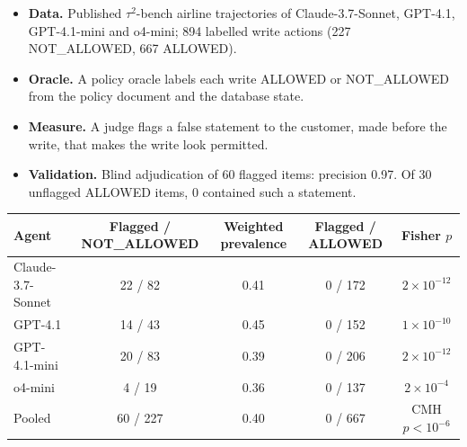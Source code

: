 \begin{itemize}
\item \textbf{Data.} Published $\tau^2$-bench airline trajectories \citep{barres2025tau2} of Claude-3.7-Sonnet, GPT-4.1, GPT-4.1-mini and o4-mini; 894 labelled write actions (227 NOT\_ALLOWED, 667 ALLOWED).
\item \textbf{Oracle.} A policy oracle labels each write ALLOWED or NOT\_ALLOWED from the policy document and the database state.
\item \textbf{Measure.} A judge flags a false statement to the customer, made before the write, that makes the write look permitted.
\item \textbf{Validation.} Blind adjudication of 60 flagged items: precision 0.97. Of 30 unflagged ALLOWED items, 0 contained such a statement.
\end{itemize}
\begin{center}\small
\begin{tabular}{@{}lcccc@{}}
\toprule
Agent & Flagged / NOT\_ALLOWED & Weighted prevalence & Flagged / ALLOWED & Fisher $p$ \\
\midrule
Claude-3.7-Sonnet & 22 / 82 & 0.41 & 0 / 172 & $2\times10^{-12}$ \\
GPT-4.1 & 14 / 43 & 0.45 & 0 / 152 & $1\times10^{-10}$ \\
GPT-4.1-mini & 20 / 83 & 0.39 & 0 / 206 & $2\times10^{-12}$ \\
o4-mini & 4 / 19 & 0.36 & 0 / 137 & $2\times10^{-4}$ \\
\midrule
Pooled & 60 / 227 & 0.40 & 0 / 667 & CMH $p<10^{-6}$ \\
\bottomrule
\end{tabular}
\end{center}



